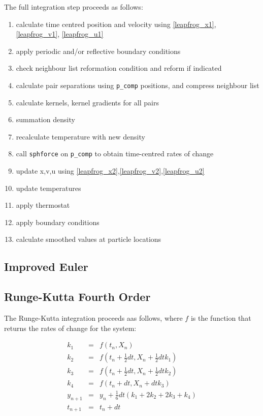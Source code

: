 The full integration step proceeds as follows:
\begin{enumerate}
\item calculate time centred position and velocity using 
    \ref{leapfrog_x1}, \ref{leapfrog_v1}, \ref{leapfrog_u1}
\item apply periodic and/or reflective boundary conditions
\item check neighbour list reformation condition and reform if indicated
\item calculate pair separations using \texttt{p\_comp} positions, and compress
    neighbour list
\item calculate kernels, kernel gradients for all pairs
\item summation density
\item recalculate temperature with new density
\item call \texttt{sphforce} on \texttt{p\_comp} to obtain time-centred rates
    of change
\item update x,v,u using \ref{leapfrog_x2},\ref{leapfrog_v2},\ref{leapfrog_u2}
\item update temperatures 
\item apply thermostat
\item apply boundary conditions
\item calculate smoothed values at particle locations
\end{enumerate}

\subsection{Improved Euler}

\subsection{Runge-Kutta Fourth Order}
The Runge-Kutta integration proceeds aas follows, where \(f\) is the function
that returns the rates of change for the system:

\begin{eqnarray}
\label{rk4}
k_{1} &=& f\left(t_{n},X_{n}\right) \\
k_{2} &=& f\left(t_{n} + \frac{1}{2}dt, X_n + \frac{1}{2}dtk_{1} \right) \\
k_{3} &=& f\left(t_{n} + \frac{1}{2}dt, X_n + \frac{1}{2}dtk_{2} \right) \\
k_{4} &=& f \left(t_{n} + dt, X_n + dtk_{3} \right)                \\
y_{n+1} &=& y_{n} + \frac{1}{6}dt \left(k_{1} + 2k_{2} + 2k_{3} + k_{4} \right) \\
t_{n+1} &=& t_{n} + dt 
\end{eqnarray}


